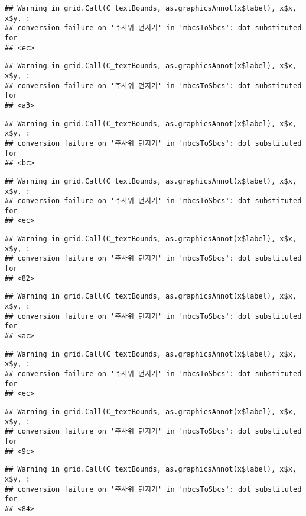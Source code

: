 \documentclass[]{book}
\begin{document}
\begin{verbatim}
## Warning in grid.Call(C_textBounds, as.graphicsAnnot(x$label), x$x, x$y, :
## conversion failure on '주사위 던지기' in 'mbcsToSbcs': dot substituted for
## <ec>
\end{verbatim}

\begin{verbatim}
## Warning in grid.Call(C_textBounds, as.graphicsAnnot(x$label), x$x, x$y, :
## conversion failure on '주사위 던지기' in 'mbcsToSbcs': dot substituted for
## <a3>
\end{verbatim}

\begin{verbatim}
## Warning in grid.Call(C_textBounds, as.graphicsAnnot(x$label), x$x, x$y, :
## conversion failure on '주사위 던지기' in 'mbcsToSbcs': dot substituted for
## <bc>
\end{verbatim}

\begin{verbatim}
## Warning in grid.Call(C_textBounds, as.graphicsAnnot(x$label), x$x, x$y, :
## conversion failure on '주사위 던지기' in 'mbcsToSbcs': dot substituted for
## <ec>
\end{verbatim}

\begin{verbatim}
## Warning in grid.Call(C_textBounds, as.graphicsAnnot(x$label), x$x, x$y, :
## conversion failure on '주사위 던지기' in 'mbcsToSbcs': dot substituted for
## <82>
\end{verbatim}

\begin{verbatim}
## Warning in grid.Call(C_textBounds, as.graphicsAnnot(x$label), x$x, x$y, :
## conversion failure on '주사위 던지기' in 'mbcsToSbcs': dot substituted for
## <ac>
\end{verbatim}

\begin{verbatim}
## Warning in grid.Call(C_textBounds, as.graphicsAnnot(x$label), x$x, x$y, :
## conversion failure on '주사위 던지기' in 'mbcsToSbcs': dot substituted for
## <ec>
\end{verbatim}

\begin{verbatim}
## Warning in grid.Call(C_textBounds, as.graphicsAnnot(x$label), x$x, x$y, :
## conversion failure on '주사위 던지기' in 'mbcsToSbcs': dot substituted for
## <9c>
\end{verbatim}

\begin{verbatim}
## Warning in grid.Call(C_textBounds, as.graphicsAnnot(x$label), x$x, x$y, :
## conversion failure on '주사위 던지기' in 'mbcsToSbcs': dot substituted for
## <84>
\end{verbatim}
\end{document}
